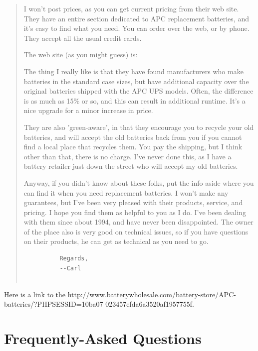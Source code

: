 {{{{{{{{\begin{quote}
I won't post prices, as you can get current pricing from their web site. They
have an entire section dedicated to APC replacement batteries, and it's easy
to find what you need. You can order over the web, or by phone. They accept
all the usual credit cards.  

The web site (as you might guess) is: 

The thing I really like is that they have found manufacturers who make
batteries in the standard case sizes, but have additional capacity over the
original batteries shipped with the APC UPS models. Often, the difference is
as much as 15\% or so, and this can result in additional runtime. It's a nice
upgrade for a minor increase in price.  

They are also 'green-aware', in that they encourage you to recycle your old
batteries, and will accept the old batteries back from you if you cannot find
a local place that recycles them. You pay the shipping, but I think other than
that, there is no charge. I've never done this, as I have a battery retailer
just down the street who will accept my old batteries.  

Anyway, if you didn't know about these folks, put the info aside where you can
find it when you need replacement batteries. I won't make any guarantees, but
I've been very pleased with their products, service, and pricing. I hope you
find them as helpful to you as I do. I've been dealing with them since about
1994, and have never been disappointed. The owner of the place also is very
good on technical issues, so if you have questions on their products, he can
get as technical as you need to go.  

\footnotesize
\begin{verbatim}
          Regards,
          --Carl
     
\end{verbatim}
\normalsize

\end{quote}

Here is a link to the 
{http://www.batterywholesale.com/battery-store/APC-batteries/?PHPSESSID=10ba07%
023457efda6a3520af1957755f}. 

\label{Frequently_002dAsked-Questions}

\section*{Frequently-Asked Questions}

}}}}}}}}
